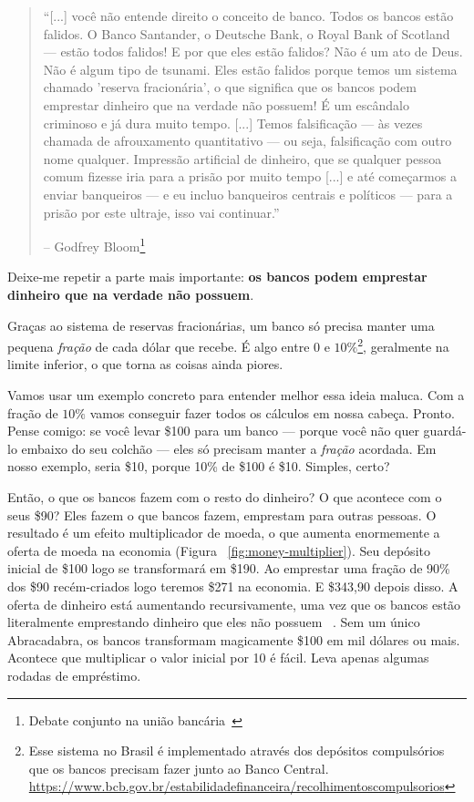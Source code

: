 \begin{quotation}\begin{samepage}
\enquote{[...] você não entende direito o conceito de banco. Todos os bancos estão falidos. O Banco Santander, o Deutsche Bank, o Royal Bank of Scotland --- estão todos falidos! E por que eles estão falidos? Não é um ato de Deus. Não é algum tipo de tsunami. Eles estão falidos porque temos um sistema chamado 'reserva fracionária', o que significa que os bancos podem emprestar dinheiro que na verdade não possuem! É um escândalo criminoso e já dura muito tempo. [...] Temos falsificação --- às vezes chamada de afrouxamento quantitativo --- ou seja, falsificação com outro nome qualquer. Impressão artificial de dinheiro, que se qualquer pessoa comum fizesse iria para a prisão por muito tempo [...] e até começarmos a enviar banqueiros --- e eu incluo banqueiros centrais e políticos --- para a prisão por este ultraje, isso vai continuar.}
\begin{flushright} -- Godfrey Bloom\footnote{Debate conjunto na união bancária~\cite{godfrey-bloom}}
\end{flushright}\end{samepage}\end{quotation}

Deixe-me repetir a parte mais importante: \textbf{os bancos podem emprestar dinheiro que na verdade não possuem}.

Graças ao sistema de reservas fracionárias, um banco só precisa manter uma pequena \textit{fração} de cada dólar que recebe. É algo entre $0$ e $10\%$\footnote{Esse sistema no Brasil é implementado através dos depósitos compulsórios que os bancos precisam fazer junto ao Banco Central. \\\url{https://www.bcb.gov.br/estabilidadefinanceira/recolhimentoscompulsorios}}, geralmente na limite inferior, o que torna as coisas ainda piores.

Vamos usar um exemplo concreto para entender melhor essa ideia maluca. Com a fração de $10\%$ vamos conseguir fazer todos os cálculos em nossa cabeça. Pronto. Pense comigo: se você levar \$100 para um banco --- porque você não quer guardá-lo embaixo do seu colchão --- eles só precisam manter a \textit{fração} acordada. Em nosso exemplo, seria \$10, porque 10\% de \$100 é \$10. Simples, certo?

Então, o que os bancos fazem com o resto do dinheiro? O que acontece com o seus \$90? Eles fazem o que bancos fazem, emprestam para outras pessoas. O resultado é um efeito multiplicador de moeda, o que aumenta enormemente a oferta de moeda na economia (Figura ~\ref{fig:money-multiplier}). Seu depósito inicial de \$100 logo se transformará em \$190. Ao emprestar uma fração de 90\% dos \$90 recém-criados logo teremos \$271 na economia. E \$343,90 depois disso. A oferta de dinheiro está aumentando recursivamente, uma vez que os bancos estão literalmente emprestando dinheiro que eles não possuem ~\cite{wiki:money-multiplier}. Sem um único Abracadabra, os bancos transformam magicamente \$100 em mil dólares ou mais. Acontece que multiplicar o valor inicial por 10 é fácil. Leva apenas algumas rodadas de empréstimo.

